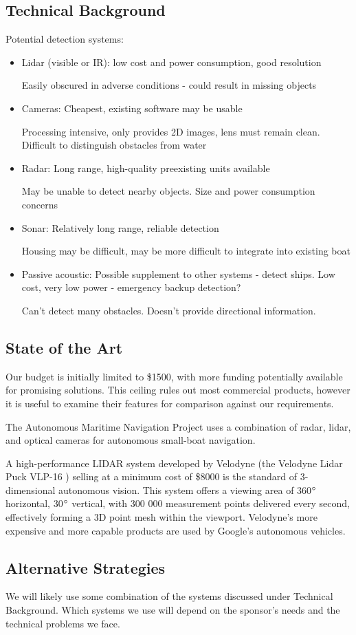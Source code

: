 \subsection{\label{sec:intro:technical-background}Technical Background}
Potential detection systems:
\begin{itemize}

\item Lidar (visible or IR): 
low cost and power consumption, good resolution

Easily obscured in adverse conditions - could result in missing objects

\item Cameras: 
Cheapest, existing software may be usable

Processing intensive, only provides 2D images, lens must remain clean.  Difficult to distinguish obstacles from water

\item Radar:
Long range, high-quality preexisting units available

May be unable to detect nearby objects.  Size and power consumption concerns

\item Sonar:
Relatively long range, reliable detection

Housing may be difficult, may be more difficult to integrate into existing boat

\item Passive acoustic:
Possible supplement to other systems - detect ships.  Low cost, very low power - emergency backup detection?

Can't detect many obstacles.  Doesn't provide directional information.
\end{itemize}

\subsection{\label{sec:intro:commercial}State of the Art}
Our budget is initially limited to \$1500, with more funding potentially available for promising solutions. This ceiling rules out most commercial products, however it is useful to examine their features for comparison against our requirements.

The Autonomous Maritime Navigation Project uses a combination of radar, lidar, and optical cameras for autonomous small-boat navigation.

A high-performance LIDAR system developed by Velodyne (the Velodyne Lidar Puck VLP-16 \cite{velodyne-vlp16}) selling at a minimum cost of \$8000 is the standard of 3-dimensional autonomous vision. This system offers a viewing area of 360$\degree$ horizontal, 30$\degree$ vertical, with 300 000 measurement points delivered every second, effectively forming a 3D point mesh within the viewport. Velodyne's more expensive and more capable products are used by Google's autonomous vehicles.

\subsection{\label{sec:intro:alternatives}Alternative Strategies}
We will likely use some combination of the systems discussed under Technical Background.  Which systems we use will depend on the sponsor's needs and the technical problems we face.
